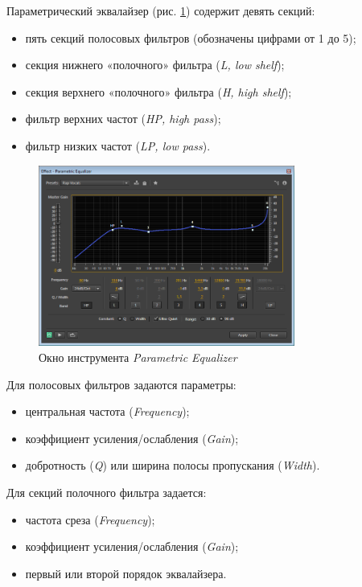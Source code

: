 \documentclass[oneside, final, 14pt]{extreport}
\begin{document}
Параметрический эквалайзер (рис. \ref{pic-parametric-01}) содержит девять секций:
\begin{itemize}
  \item пять секций полосовых фильтров (обозначены цифрами от 1 до 5);
  \item секция нижнего «полочного» фильтра (\emph{L, low shelf});
  \item секция верхнего «полочного» фильтра (\emph{H, high shelf});
  \item фильтр верхних частот (\emph{HP, high pass});
  \item фильтр низких частот (\emph{LP, low pass}).
\end{itemize}

\begin{figure}[h]
  \centering
  \includegraphics[width=0.75\textwidth]{pic-parametric-01}
  \caption{Окно инструмента \emph{Parametric Equalizer}}
  \label{pic-parametric-01}
\end{figure}

Для полосовых фильтров задаются параметры:
\begin{itemize}
  \item центральная частота (\emph{Frequency});
  \item коэффициент усиления/ослабления (\emph{Gain});
  \item добротность (\emph{Q}) или ширина полосы пропускания (\emph{Width}).
\end{itemize}
	
Для секций полочного фильтра задается:
\begin{itemize}
  \item частота среза (\emph{Frequency});
  \item коэффициент усиления/ослабления (\emph{Gain});
  \item первый или второй порядок эквалайзера.
\end{itemize}
	
\end{document}
